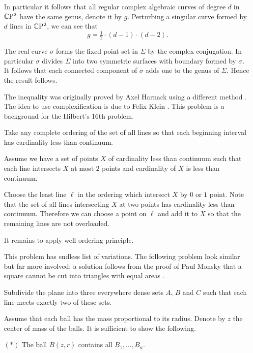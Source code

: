 In particular it follows that all regular complex algebraic curves of degree $d$ in $\mathbb{C}\mathrm{P}^2$ have the same genus,
denote it by $g$.
Perturbing a singular curve formed by $d$ lines in $\mathbb{C}\mathrm{P}^2$,
we can see that 
\[g=\tfrac12\cdot(d-1)\cdot(d-2).\]

The real curve $\sigma$ forms the fixed point set in $\Sigma$ 
by the complex conjugation. 
In particular $\sigma$ divides $\Sigma$ into two symmetric surfaces with boundary formed by $\sigma$.
It follows that each connected component of $\sigma$ adds one to the genus of $\Sigma$.
Hence the result follows.
\qeds
 
The inequality was originally proved 
by Axel Harnack using a different method \cite[see][]{harnack}.
The idea to use complexification is due to Felix Klein \cite[see][]{klein}.
This problem is a background for the Hilbert's 16th problem. 

Take any complete ordering of the set of all lines 
so that each beginning interval has cardinality less than continuum.

Assume we have a set of points $X$ of cardinality less than continuum such that each line intersects $X$ at most $2$ points and cardinality of $X$ is less than continuum.

Choose the least line $\ell$ in the ordering which intersect $X$ 
by $0$ or $1$ point.
Note that the set of all lines intersecting $X$ at two points has cardinality less than continuum.
Therefore we can choose a point on $\ell$ and add it to $X$ so that the remaining lines are not overloaded.

It remains to apply well ordering principle.
\qeds

This problem has endless list of variations.
The following problem look similar but far more involved;
a solution follows from the proof of Paul Monsky that a square cannot be cut into triangles with equal areas \cite[see][]{monsky}.

\begin{pr}
Subdivide the plane into three everywhere dense sets $A$, $B$ and $C$ such that each line meets exactly two of these sets.
\end{pr}


Assume that each ball has the mass proportional to its radius.
Denote by $z$  the center of mass of the balls.
It is sufficient to show the following.
\begin{cl}{$({*})$}
The ball $B(z,r)$ contains all $B_1,\dots,B_n$.
\end{cl}

